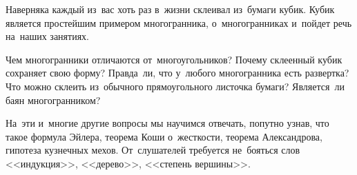 



Наверняка каждый из~вас хоть раз в~жизни склеивал из~бумаги кубик.
Кубик является простейшим примером многогранника, о~многогранниках и~пойдет
речь на~наших занятиях.

Чем многогранники отличаются от~многоугольников?
Почему склеенный кубик сохраняет свою форму?
Правда~ли, что у~любого многогранника есть развертка?
Что можно склеить из~обычного прямоугольного листочка бумаги?
Является~ли баян многогранником?

На~эти и~многие другие вопросы мы научимся отвечать, попутно узнав, что такое
формула Эйлера, теорема Коши о~жесткости, теорема Александрова, гипотеза
кузнечных мехов.
От~слушателей требуется не~бояться слов <<индукция>>, <<дерево>>,
<<степень вершины>>.

